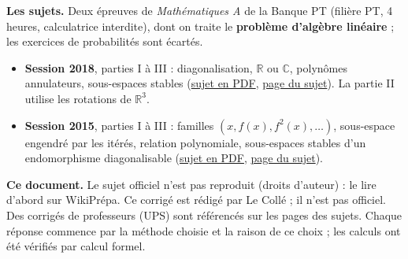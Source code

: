 \documentclass[a4paper,11pt]{article}
\numberwithin{equation}{section}
\numberwithin{figure}{section}
\numberwithin{table}{section}
\theoremstyle{enonce}
\theoremstyle{exemple}
\theoremstyle{remarque}
\newcommand{\R}{\mathbb{R}}
\newcommand{\C}{\mathbb{C}}
\newcommand{\WP}{https://wikiprepa.fr/concours/ecrit/banque-pt_maths-a_pt_2018}
\newcommand{\WPsujet}{https://wikiprepa.fr/concours/data/banque-pt_maths-a_pt_2018.pdf}
\newcommand{\WPb}{https://wikiprepa.fr/concours/ecrit/banque-pt_maths-a_pt_2015}
\newcommand{\WPbsujet}{https://wikiprepa.fr/concours/data/banque-pt_maths-a_pt_2015.pdf}
\begin{document}
\pagestyle{fancy}
\thispagestyle{plain}

\vspace*{2.9cm}

\begin{tcolorbox}[enhanced,colback=Fond,colframe=Fond,arc=0pt,boxrule=0pt,left=10pt,right=10pt,top=8pt,bottom=8pt]
\small
\textbf{\sffamily\color{Bleu}Les sujets.} Deux épreuves de \emph{Mathématiques A} de la Banque PT (filière PT, 4 heures,
calculatrice interdite), dont on traite le \textbf{problème d'algèbre linéaire} ; les exercices de probabilités sont écartés.
\begin{itemize}[leftmargin=1.2em,itemsep=1pt,topsep=2pt]
\item \textbf{Session 2018}, parties I à III : diagonalisation, $\R$ ou $\C$, polynômes annulateurs, sous-espaces stables
(\href{\WPsujet}{sujet en PDF}, \href{\WP}{page du sujet}). La partie II utilise les rotations de $\R^3$.
\item \textbf{Session 2015}, parties I à III : familles $(x,f(x),f^2(x),\dots)$, sous-espace engendré par les itérés, relation
polynomiale, sous-espaces stables d'un endomorphisme diagonalisable (\href{\WPbsujet}{sujet en PDF}, \href{\WPb}{page du sujet}).
\end{itemize}
\textbf{\sffamily\color{Bleu}Ce document.} Le sujet officiel n'est pas reproduit (droits d'auteur) : le lire d'abord sur WikiPrépa.
Ce corrigé est rédigé par Le Collé ; il n'est pas officiel. Des corrigés de professeurs (UPS) sont référencés sur les pages des
sujets. Chaque réponse commence par la méthode choisie et la raison de ce choix ; les calculs ont été vérifiés par calcul formel.
\end{tcolorbox}
\end{document}
